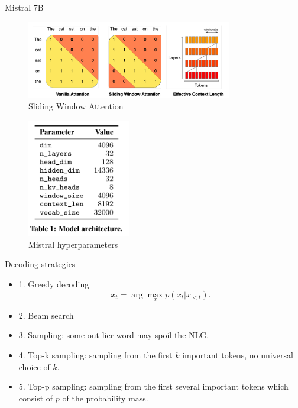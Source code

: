 \documentclass{beamer}
\begin{document}
\begin{frame}{Mistral 7B}
	\begin{figure}
		\centering
		\includegraphics[width=0.8\textwidth]{fig/SWA.jpg}
		\caption{Sliding Window Attention}
	\end{figure}
	\begin{figure}
		\centering
		\includegraphics[width=0.4\textwidth]{fig/Mistral.jpg}
		\caption{Mistral hyperparameters}
	\end{figure}
\end{frame}

\begin{frame}{Decoding strategies}
	\begin{itemize}
		\item 1. Greedy decoding
		\begin{equation}
			x_t= \arg\max_{x} p(x_t|x_{<t}).
		\end{equation}
		\item 2. Beam search
		\item 3. Sampling: some out-lier word may spoil the NLG.
		\item 4. Top-k sampling: sampling from the first $k$ important tokens, no universal choice of $k$.
		\item 5. Top-p sampling: sampling from the first several important tokens which consist of $p$ of the probability mass.
	\end{itemize}
\end{frame}
\end{document}
